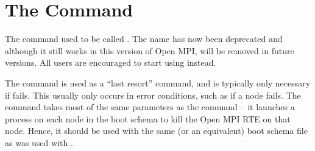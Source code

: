 
\section{The  Command}
\label{sec:commands-lamwipe}

The  command used to be called .  The name
 has now been deprecated and although it still works in
this version of Open MPI, will be removed in future versions.  All
users are encouraged to start using  instead.

The  command is used as a ``last resort'' command, and is
typically only necessary if  fails.  This usually only
occurs in error conditions, such as if a node fails.  The
 command takes most of the same parameters as the
 command -- it launches a process on each node in the
boot schema to kill the Open MPI RTE on that node.  Hence, it should be
used with the same (or an equivalent) boot schema file as was used
with .

